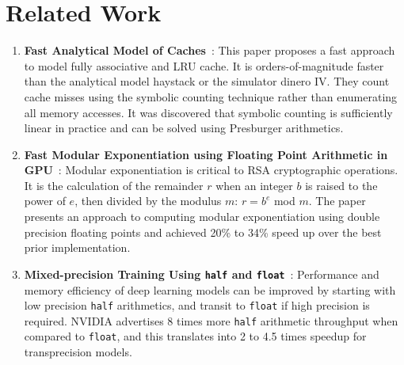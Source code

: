 \documentclass[logo,bsc,singlespacing,parskip]{infthesis}
\newcommand{\dthalf}{\texttt{half}}
\newcommand{\dtfloat}{\texttt{float}}
\begin{document}
\chapter{Related Work}
\begin{enumerate}
    
    \item \textbf{Fast Analytical Model of Caches}~\cite{CacheModel}: This paper proposes a fast approach to model fully associative and LRU cache. It is orders-of-magnitude faster than the analytical model haystack or the simulator dinero IV. They count cache misses using the symbolic counting technique rather than enumerating all memory accesses. It was discovered that symbolic counting is sufficiently linear in practice and can be solved using Presburger arithmetics.
    
    \item \textbf{Fast Modular Exponentiation using Floating Point Arithmetic in GPU}~\cite{intfpu-modexp}: Modular exponentiation is critical to RSA cryptographic operations. It is the calculation of the remainder $r$ when an integer $b$ is raised to the power of $e$, then divided by the modulus $m$: $r = b ^ e$ mod $m$. The paper presents an approach to computing modular exponentiation using double precision floating points and achieved 20\% to 34\% speed up over the best prior implementation.
    
    \item \textbf{Mixed-precision Training Using \dthalf{} and
    \dtfloat{}}~\cite{fp16-fast}: Performance and memory efficiency of deep
    learning models can be improved by starting with low precision \dthalf{}
    arithmetics, and transit to \dtfloat{} if high precision is required. NVIDIA
    advertises 8 times more \dthalf{} arithmetic throughput when compared
    to \dtfloat{}, and this translates into 2 to 4.5 times speedup 
    for transprecision models.
\end{enumerate}


\end{document}
